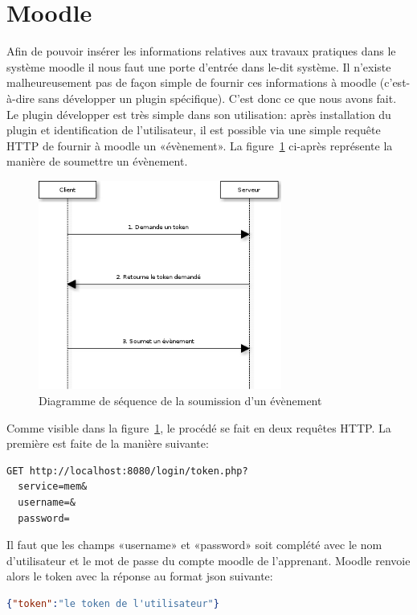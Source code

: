 \documentclass[a4paper,11pt]{report}
\begin{document}
\section{Moodle}

Afin de pouvoir insérer les informations relatives aux travaux pratiques dans le système moodle il nous faut une porte d'entrée dans le-dit système. Il n'existe malheureusement pas de façon simple de fournir ces informations à moodle (c'est-à-dire sans développer un plugin spécifique).
C'est donc ce que nous avons fait. Le plugin développer est très simple dans son utilisation: après installation du plugin et identification de l'utilisateur, il est possible via une simple requête HTTP de fournir à moodle un «évènement». La figure~\ref{seq-submit-event} ci-après représente la manière de soumettre un évènement.

\begin{figure}[h]
   \caption{\label{seq-submit-event} Diagramme de séquence de la soumission d'un évènement}
   \includegraphics[width=8cm, keepaspectratio=true]{mem-seq-submit-event.png}
\end{figure}

Comme visible dans la figure~\ref{seq-submit-event}, le procédé se fait en deux requêtes HTTP. La première est faite de la manière suivante:

\begin{lstlisting}[caption={1. Requête d'un token}]
GET http://localhost:8080/login/token.php?
  service=mem&
  username=&
  password=
\end{lstlisting}

Il faut que les champs «username» et «password» soit complété avec le nom d'utilisateur et le mot de passe du compte moodle de l'apprenant.
Moodle renvoie alors le token avec la réponse au format json suivante:

\begin{lstlisting}[language=json, caption={2. Retourne le token}]
{"token":"le token de l'utilisateur"}
\end{lstlisting}
\end{document}
